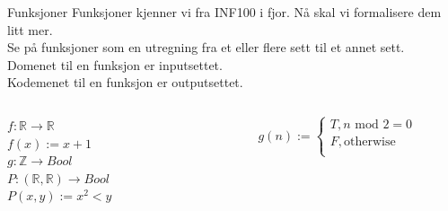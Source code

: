 \begin{frame}{Funksjoner}
    Funksjoner kjenner vi fra INF100 i fjor. Nå skal vi formalisere dem litt mer.\\
    Se på funksjoner som en utregning fra et eller flere sett til et annet sett.\\
    Domenet til en funksjon er inputsettet.\\
    Kodemenet til en funksjon er outputsettet.\\
    \begin{columns}
    \begin{column}{0.28\textwidth}
         $f : \mathbb{R} \rightarrow \mathbb{R}$\\
        $f(x) := x+1$ \\
        $g : \mathbb{Z} \rightarrow Bool$ \\
        $P : (\mathbb{R}, \mathbb{R}) \rightarrow Bool$\\
        $P(x, y) := x^2 < y$
     \end{column}
    \begin{column}{0.28\textwidth}
         $$
            g(n) :=
            \begin{cases}
            T, n \text{ mod } 2 = 0\\
            F, \text{otherwise}\\
            \end{cases}
        $$
    \end{column}
       
       
        
    \end{columns}
\end{frame}

